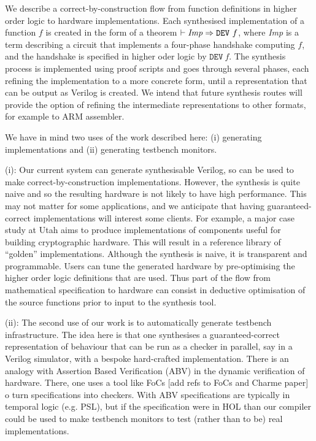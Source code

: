 
We describe a correct-by-construction flow from function definitions
in higher order logic to hardware implementations.  Each synthesised
implementation of a function $f$ is created in the form of a theorem
$\vdash {\it{Imp}}\Rightarrow\texttt{DEV}~f$, where {\it{Imp}} is a
term describing a circuit that implements a four-phase handshake
computing $f$, and the handshake is specified in higher oder logic by
$\texttt{DEV}~f$. The synthesis process is implemented using proof
scripts and goes through several phases, each refining the
implementation to a more concrete form, until a representation that
can be output as Verilog is created. We intend that future synthesis
routes will provide the option of refining the intermediate
representations to other formats, for example to ARM
assembler.

We have in mind two uses of the work described here: (i) generating
implementations and (ii) generating testbench monitors.

(i): Our current system can generate synthesisable Verilog, so can be
used to make correct-by-construction implementations. However, the
synthesis is quite naive and so the resulting hardware is not likely
to have high performance. This may not matter for some applications,
and we anticipate that having guaranteed-correct implementations will
interest some clients. For example, a major case study at Utah aims to
produce implementations of components useful for building
cryptographic hardware.  This will result in a reference library of ``golden''
implementations. Although the synthesis is naive, it is transparent
and programmable. Users can tune the generated hardware by
pre-optimising the higher order logic definitions that are used. Thus
part of the flow from mathematical specification to hardware can
consist in deductive optimisation of the source functions prior to
input to the synthesis tool.

(ii): The second use of our work is to automatically generate testbench
infrastructure. The idea here is that one synthesises a
guaranteed-correct representation of behaviour that can be run as a checker in
parallel, say in a Verilog simulator, with a bespoke hard-crafted
implementation. There is an analogy with
Assertion Based Verification (ABV) in the dynamic verification of
hardware. There, one uses a tool like FoCs [add refs to FoCs and Charme paper] 
o turn specifications into checkers.  With ABV specifications
are typically in temporal logic (e.g.{} PSL), but if the specification
were in HOL than our compiler could be used to make
testbench monitors to test (rather than to be) real implementations.

